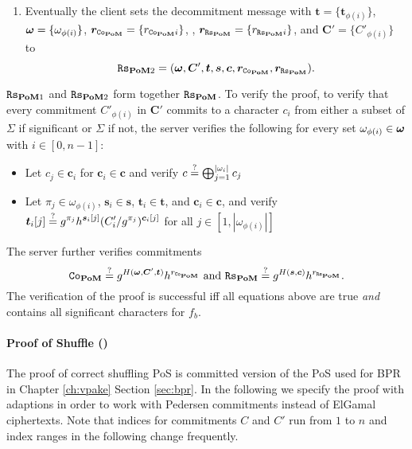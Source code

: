\begin{enumerate}
  \item %
    Eventually the client sets the decommitment message with $\bm t = \{\bm t_{\phi(i)} \}$, $\boldsymbol{\mathbf{\omega}}=\{\omega_{\phi(i)}\}$, $\bm r_{\mathtt{Co}_\mathsf{\bf PoM}}=\{r_{\mathtt{Co}_\mathsf{\bf PoM} i}\}$, , $\bm r_{\mathtt{Rs}_\mathsf{\bf PoM}}=\{r_{\mathtt{Rs}_\mathsf{\bf PoM} i}\}$, and $\bm C'=\{C'_{\phi(i)}\}$ to
    \[\mathtt{Rs}_{\mathsf{\bf PoM}2}=(\boldsymbol{\mathbf{\omega}}, \bm C', \bm t, \bm s, \bm c, \bm r_{\mathtt{Co}_\mathsf{\bf PoM}}, \bm r_{\mathtt{Rs}_\mathsf{\bf PoM}}).\]
\end{enumerate}

\noindent
$\mathtt{Rs}_{\mathsf{\bf PoM}1}$ and $\mathtt{Rs}_{\mathsf{\bf PoM}2}$ form together $\mathtt{Rs}_{\mathsf{\bf PoM}}$.
To verify the proof, \ie to verify that every commitment $C'_{\phi(i)}$ in $\bm C'$ commits to a character $c_i$ from either a subset of $\Sigma$ if significant or $\Sigma$ if not, the server verifies the following for every set $\omega_{\phi(i)} \in \boldsymbol{\mathbf{\omega}}$ with $i\in[0,n-1]$:
\begin{itemize}
% 

  \item Let $c_j\in\bm c_i$ for $\bm c_i\in\bm c$ and verify
        $c \stackrel{?}{=} \bigoplus_{j=1}^{|\omega_i|}c_j$

  \item Let $\pi_j\in\omega_{\phi(i)}$, $\bm s_i \in \bm s$, $\bm t_i\in \bm t$, and $\bm c_i \in \bm c$, and verify
        $\displaystyle \bm t_{i}[j] \stackrel{?}{=} g^{\pi_j}h^{\bm s_i[j]}(C'_i/g^{\pi_j})^{\bm c_i[j]}$
        for all $j\in[1,|\omega_{\phi(i)}|]$
\end{itemize}
The server further verifies commitments 
\[
  \mathtt{Co}_\mathsf{\bf PoM} \stackrel{?}{=} g^{H(\boldsymbol{\mathbf{\omega}}, \bm C', \bm t)} h^{r_{\mathtt{Co}_\mathsf{\bf PoM}}} \text{ and } \mathtt{Rs}_\mathsf{\bf PoM} \stackrel{?}{=} g^{H(\bm s, \bm c)} h^{r_{\mathtt{Rs}_\mathsf{\bf PoM}}}.
\]
The verification of the proof is successful iff all equations above are true \emph{and} \vect{\omega} contains all significant characters for $f_b$.

\paragraph{Proof of Shuffle (\PoS)}
The proof of correct shuffling \ac{PoS} is committed version of the \ac{PoS} used for \ac{BPR} in Chapter \ref{ch:vpake} Section \ref{sec:bpr}.
In the following we specify the proof with adaptions in order to work with Pedersen commitments instead of ElGamal ciphertexts.
Note that indices for commitments $C$ and $C'$ run from $1$ to $n$ and index ranges in the following change frequently.

